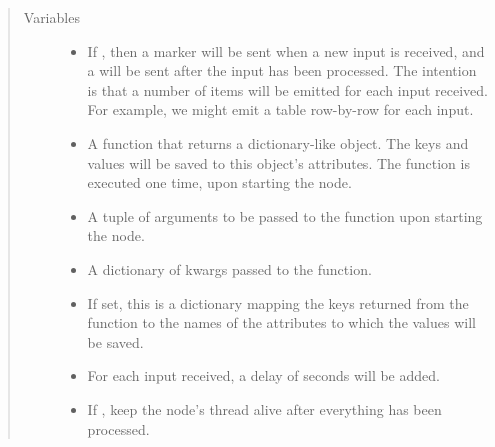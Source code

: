 \documentclass[letterpaper,10pt,english]{sphinxmanual}
\begin{document}
\begin{fulllineitems}
\begin{enumerate}
\end{enumerate}
\begin{quote}\begin{description}
\item[{Variables}] \leavevmode\begin{itemize}
\item {} 
 \textendash{} If , then a  marker will
be sent when a new input is received, and a  will be sent
after the input has been processed. The intention is that a number of
items will be emitted for each input received. For example, we might
emit a table row-by-row for each input.

\item {} 
 \textendash{} A function that returns a dictionary-like object.
The keys and values will be saved to this  object’s
attributes. The function is executed one time, upon starting the node.

\item {} 
 \textendash{} A tuple of arguments to be passed to the
 function upon starting the node.

\item {} 
 \textendash{} A dictionary of kwargs passed to the
 function.

\item {} 
 \textendash{} If set, this is a dictionary mapping
the keys returned from the  function to the
names of the attributes to which the values will be saved.

\item {} 
 \textendash{} For each input received, a delay of  seconds
will be added.

\item {} 
 \textendash{} If , keep the node’s thread alive after
everything has been processed.


\end{itemize}
\end{description}
\end{quote}
\end{fulllineitems}
\end{document}
